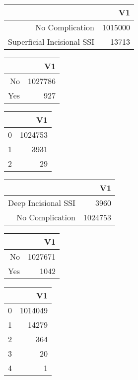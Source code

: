 \bigskip\bigskip
\centering
\begin{tabular}{rr}
  \hline
 & V1 \\ 
  \hline
No Complication & 1015000 \\ 
  Superficial Incisional SSI & 13713 \\ 
   \hline
\end{tabular}

\bigskip\bigskip
\centering
\begin{tabular}{rr}
  \hline
 & V1 \\ 
  \hline
No & 1027786 \\ 
  Yes & 927 \\ 
   \hline
\end{tabular}

\bigskip\bigskip
\centering
\begin{tabular}{rr}
  \hline
 & V1 \\ 
  \hline
0 & 1024753 \\ 
  1 & 3931 \\ 
  2 &  29 \\ 
   \hline
\end{tabular}

\bigskip\bigskip
\centering
\begin{tabular}{rr}
  \hline
 & V1 \\ 
  \hline
Deep Incisional SSI & 3960 \\ 
  No Complication & 1024753 \\ 
   \hline
\end{tabular}

\bigskip\bigskip
\centering
\begin{tabular}{rr}
  \hline
 & V1 \\ 
  \hline
No & 1027671 \\ 
  Yes & 1042 \\ 
   \hline
\end{tabular}

\bigskip\bigskip
\centering
\begin{tabular}{rr}
  \hline
 & V1 \\ 
  \hline
0 & 1014049 \\ 
  1 & 14279 \\ 
  2 & 364 \\ 
  3 &  20 \\ 
  4 &   1 \\ 
   \hline
\end{tabular}

